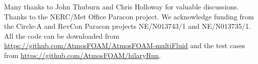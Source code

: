 \documentclass[draft]{agujournal2019}
\begin{document}
\acknowledgments

Many thanks to John Thuburn and Chris Holloway for valuable discussions.
Thanks to the NERC/Met Office Paracon project. We acknowledge funding
from the Circle-A and RevCon Paracon projects NE/N013743/1 and NE/N013735/1. All the code can be downloaded from \url{https://github.com/AtmosFOAM/AtmosFOAM-multiFluid} and the test cases from \url{https://github.com/AtmosFOAM/hilaryRun}.


\end{document}
